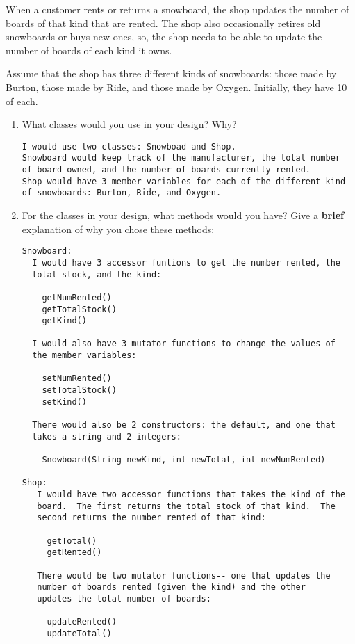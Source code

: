 \begin{enumerate}
		When a customer rents or returns a snowboard, the shop 
		updates the number of boards of that kind that are rented.  The
		shop also occasionally retires old snowboards or buys new
		ones, so, the shop needs to be able to update the number
		of boards of each kind it owns. 

		Assume that the shop has three different kinds of snowboards:
		those made by Burton, those made by Ride, and those made
		by Oxygen. Initially, they have 10 of each. 
		\begin{enumerate}
			\item What classes would you use in your design? Why?
\begin{verbatim}
I would use two classes: Snowboad and Shop.  
Snowboard would keep track of the manufacturer, the total number
of board owned, and the number of boards currently rented.
Shop would have 3 member variables for each of the different kind
of snowboards: Burton, Ride, and Oxygen.
\end{verbatim}
			\item For the classes in your design, what methods
				would you have?  Give a {\bf brief} explanation
				of why you chose these methods:
\begin{verbatim}
Snowboard:
  I would have 3 accessor funtions to get the number rented, the
  total stock, and the kind:
  
    getNumRented()
    getTotalStock()
    getKind()
    
  I would also have 3 mutator functions to change the values of
  the member variables:
  
    setNumRented()
    setTotalStock()
    setKind()
    
  There would also be 2 constructors: the default, and one that
  takes a string and 2 integers:
  
    Snowboard(String newKind, int newTotal, int newNumRented)
    
Shop:
   I would have two accessor functions that takes the kind of the
   board.  The first returns the total stock of that kind.  The
   second returns the number rented of that kind:
   
     getTotal()
     getRented()
     
   There would be two mutator functions-- one that updates the
   number of boards rented (given the kind) and the other
   updates the total number of boards:
   
     updateRented()
     updateTotal()
     

\end{verbatim}
\end{enumerate}
\end{enumerate}
